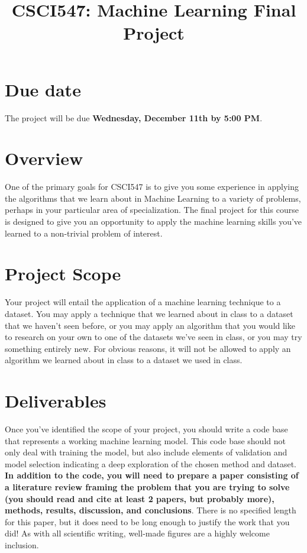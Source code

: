\documentclass[12pt]{article}
\title{CSCI547: Machine Learning Final Project}
\begin{document}
\maketitle

\section*{Due date}
The project will be due {\bf Wednesday, December 11th by 5:00 PM}.

\section*{Overview}
One of the primary goals for CSCI547 is to give you some experience in applying the algorithms that we learn about in Machine Learning to a variety of problems, perhaps in your particular area of specialization.  The final project for this course is designed to give you an opportunity to apply the machine learning skills you've learned to a non-trivial problem of interest.

\section*{Project Scope}
Your project will entail the application of a machine learning technique to a dataset.  You may apply a technique that we learned about in class to a dataset that we haven't seen before, or you may apply an algorithm that you would like to research on your own to one of the datasets we've seen in class, or you may try something entirely new.  For obvious reasons, it will not be allowed to apply an algorithm we learned about in class to a dataset we used in class.   

\section*{Deliverables}
Once you've identified the scope of your project, you should write a code base that represents a working machine learning model.  This code base should not only deal with training the model, but also include elements of validation and model selection indicating a deep exploration of the chosen method and dataset.  {\bf In addition to the code, you will need to prepare a paper consisting of a literature review framing the problem that you are trying to solve (you should read and cite at least 2 papers, but probably more), methods, results, discussion, and conclusions}.  There is no specified length for this paper, but it does need to be long enough to justify the work that you did!  As with all scientific writing, well-made figures are a highly welcome inclusion.    
\end{document}
